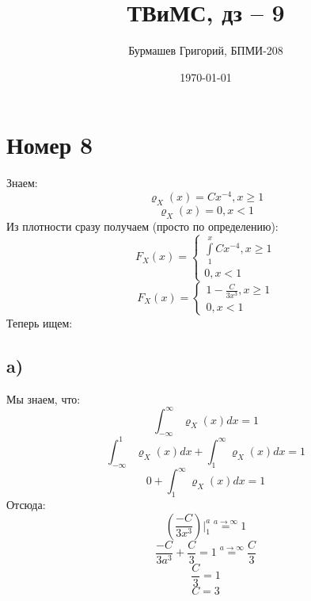 \documentclass[a4paper,12pt]{article}
\author{Бурмашев Григорий, БПМИ-208}
\title{ТВиМС, дз -- 9}
\date{\today}
\begin{document}
\maketitle
\section*{Номер 8}
Знаем:
\[
\varrho_X(x) = Cx^{-4} ,  x \geq 1
\]
\[
\varrho_X(x) = 0, x < 1
\]
Из плотности сразу получаем (просто по определению):
\[
F_X(x) = \begin{cases}
\int\limits_1^x Cx^{-4}, x \geq 1 \\
0 , x < 1
\end{cases}
\]
\[
F_X(x) = \begin{cases}
1 - \frac{C}{3x^3}, x \geq 1 \\
0 , x < 1
\end{cases}
\]
Теперь ищем:
\subsection*{a)}
Мы знаем, что:
\[
\int_{-\infty}^{\infty} \varrho_X(x) dx = 1 
\]
\[
\int_{-\infty}^{1} \varrho_X(x) dx + \int_{1}^{\infty} \varrho_X(x) dx = 1 
\]
\[
0 + \int_{1}^{\infty} \varrho_X(x) dx = 1 
\]
Отсюда:
\[
\left(\frac{-C}{3x^3}\right) \Bigg|^a_1 \overset{a \rightarrow \infty }{=} 1
\]
\[
\frac{-C}{3a^3} + \frac{C}{3} = 1 \overset{a \rightarrow \infty }{=} \frac{C}{3}
\]
\[
\frac{C}{3} = 1
\]
\[
C = 3
\]
\end{document}

